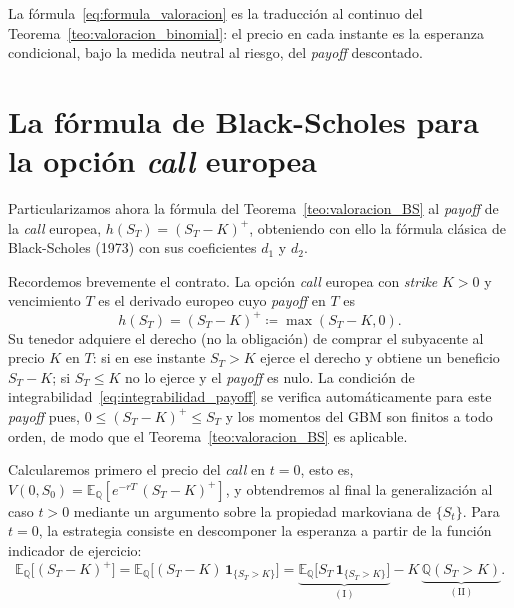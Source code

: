 \documentclass[11pt,a4paper,oneside]{report}
\theoremstyle{plain}
\theoremstyle{definition}
\theoremstyle{remark}
\newcommand{\E}{\mathbb{E}}
\newcommand{\Q}{\mathbb{Q}}
\newcommand{\1}{\mathbf{1}}
\newcommand{\eqdef}{\coloneqq}
\begin{document}
La
fórmula~\eqref{eq:formula_valoracion} es la traducción al continuo
del Teorema~\ref{teo:valoracion_binomial}: el precio en cada
instante es la esperanza condicional, bajo la medida neutral al
riesgo, del \emph{payoff} descontado.

\section{La fórmula de Black-Scholes para la opción \emph{call} europea}
\label{sec:formula_bs}

Particularizamos ahora la fórmula del
Teorema~\ref{teo:valoracion_BS} al \emph{payoff} de la \emph{call}
europea, $h(S_T) = (S_T - K)^+$, obteniendo con ello la fórmula clásica de
Black-Scholes (1973) con sus coeficientes $d_1$ y $d_2$.

Recordemos brevemente
el contrato. La opción \emph{call} europea con \emph{strike} $K > 0$
y vencimiento $T$ es el derivado europeo cuyo \emph{payoff} en $T$ es
\begin{equation}\label{eq:payoff_call}
  h(S_T) = (S_T - K)^+ \eqdef \max(S_T - K, 0).
\end{equation}
Su tenedor adquiere el derecho (no la obligación) de comprar el
subyacente al precio $K$ en $T$: si en ese instante $S_T > K$ ejerce
el derecho y obtiene un beneficio $S_T - K$; si $S_T \leq K$ no lo
ejerce y el \emph{payoff} es nulo. La condición de
integrabilidad~\eqref{eq:integrabilidad_payoff} se verifica
automáticamente para este \emph{payoff} pues, $0 \leq (S_T - K)^+ \leq
S_T$ y los momentos del GBM son finitos a todo orden, de modo que el
Teorema~\ref{teo:valoracion_BS} es aplicable.

Calcularemos primero el precio del
\emph{call} en $t = 0$, esto es, $V(0, S_0) = \E_\Q[e^{-rT}\, (S_T -
K)^+]$, y obtendremos al final la generalización al caso $t > 0$ mediante un argumento sobre la propiedad markoviana de $\{S_t\}$. Para $t = 0$, la estrategia consiste en descomponer la
esperanza a partir de la función indicador de ejercicio:
\begin{equation}\label{eq:descomposicion_call}
  \E_\Q\bigl[(S_T - K)^+\bigr]
  = \E_\Q\bigl[(S_T - K)\, \mathbf{1}_{\{S_T > K\}}\bigr]
  = \underbrace{\E_\Q\bigl[S_T\, \mathbf{1}_{\{S_T > K\}}\bigr]}_{(\mathrm{I})}
   - K\, \underbrace{\Q(S_T > K)}_{(\mathrm{II})}.
\end{equation}
\end{document}
